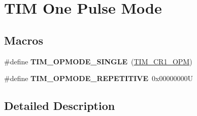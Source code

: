 \hypertarget{group___t_i_m___one___pulse___mode}{}\section{T\+IM One Pulse Mode}
\label{group___t_i_m___one___pulse___mode}
\subsection*{Macros}
\begin{DoxyCompactItemize}
\item 
\mbox{\label{group___t_i_m___one___pulse___mode_gab0447b341024e86145c7ce0dc2931fc6}} 
\#define {\bfseries T\+I\+M\+\_\+\+O\+P\+M\+O\+D\+E\+\_\+\+S\+I\+N\+G\+LE}~(\mbox{\hyperlink{group___peripheral___registers___bits___definition_ga6d3d1488296350af6d36fbbf71905d29}{T\+I\+M\+\_\+\+C\+R1\+\_\+\+O\+PM}})
\item 
\mbox{\label{group___t_i_m___one___pulse___mode_ga14a7b6f95769c5b430f65189d9c7cfa3}} 
\#define {\bfseries T\+I\+M\+\_\+\+O\+P\+M\+O\+D\+E\+\_\+\+R\+E\+P\+E\+T\+I\+T\+I\+VE}~0x00000000U
\end{DoxyCompactItemize}


\subsection{Detailed Description}
